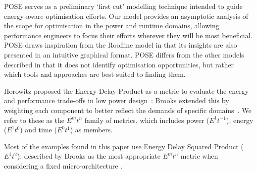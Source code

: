 POSE serves as a preliminary `first cut' modelling technique intended to guide energy-aware optimisation efforts.
Our model provides an asymptotic analysis of the scope for optimisation in the power and runtime domains, allowing performance engineers to focus their efforts wherever they will be most beneficial.
POSE draws inspiration from the Roofline model in that its insights are also presented in an intuitive graphical format.
POSE differs from the other models described in that it does not identify optimisation opportunities, but rather which tools and approaches are best suited to finding them.  


Horowitz proposed the Energy Delay Product as a metric to evaluate the energy and performance trade-offs in low power design~\cite{horowitz:1994aa}:
Brooks extended this by weighting each component to better reflect the demands of specific domains~\cite{brooks:2000ab}.
We refer to these as the $E^mt^n$ family of metrics, which includes power ($E^1t^{-1}$), energy ($E^1t^0$) and time ($E^0t^1$) as members.

Most of the examples found in this paper use Energy Delay Squared Product ($E^1t^2$); described by Brooks as the most appropriate $E^mt^n$ metric when considering a fixed micro-architecture \cite{brooks:2000aa}.
